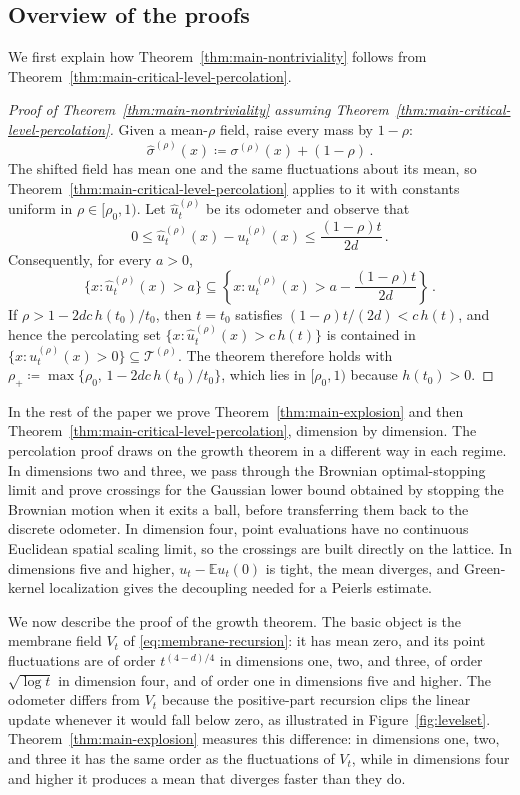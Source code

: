 \documentclass[11pt]{amsart}
\theoremstyle{plain}
\theoremstyle{definition}
\newcommand{\E}{\mathbb{E}}
\begin{document}
\subsection{Overview of the proofs}\label{ssec:overview}

We first explain how Theorem~\ref{thm:main-nontriviality} follows from
Theorem~\ref{thm:main-critical-level-percolation}.

\begin{proof}[Proof of Theorem~\ref{thm:main-nontriviality} assuming Theorem~\ref{thm:main-critical-level-percolation}]
Given a mean-$\rho$ field, raise every mass by $1-\rho$:
\[
    \widehat\sigma^{(\rho)}(x)\coloneqq \sigma^{(\rho)}(x)+(1-\rho)\, .
\]
The shifted field has mean one and the same fluctuations about its mean, so
Theorem~\ref{thm:main-critical-level-percolation} applies to it with constants
uniform in $\rho\in[\rho_0,1)$. Let $\widehat u_t^{(\rho)}$ be its odometer and observe that
\[
    0\leq \widehat u_t^{(\rho)}(x)-u_t^{(\rho)}(x)
    \leq \frac{(1-\rho)t}{2d}\, .
\]
Consequently, for every $a>0$,
\[
    \{x:\widehat u_t^{(\rho)}(x)>a\}
    \subseteq
    \left\{x:u_t^{(\rho)}(x)>a-\frac{(1-\rho)t}{2d}\right\}\, .
\]
If $\rho>1-2dc\,h(t_0)/t_0$, then $t=t_0$ satisfies
$(1-\rho)t/(2d)<c\,h(t)$, and hence the percolating set
$\{x:\widehat u_t^{(\rho)}(x)>c\,h(t)\}$
is contained in $\{x:u_t^{(\rho)}(x)>0\}\subseteq\mathcal T^{(\rho)}$.
The theorem therefore holds with
$\rho_+\coloneqq\max\{\rho_0,\,1-2dc\,h(t_0)/t_0\}$, which lies in
$[\rho_0,1)$ because $h(t_0)>0$.
\end{proof}

In the rest of the paper we prove Theorem~\ref{thm:main-explosion} and then
Theorem~\ref{thm:main-critical-level-percolation}, dimension by dimension. The percolation proof draws on
the growth theorem in a different way in each regime. In dimensions two and
three, we pass through the Brownian optimal-stopping limit and prove crossings
for the Gaussian lower bound obtained by stopping the Brownian motion when it
exits a ball, before transferring them back to the discrete odometer. In dimension four, point evaluations have no continuous
Euclidean spatial scaling limit, so the crossings are built directly on the
lattice. In dimensions five and higher, $u_t-\E u_t(0)$ is tight, the mean
diverges, and Green-kernel localization gives the decoupling needed for a
Peierls estimate.

We now describe the proof of the growth theorem. The basic object is the
membrane field $V_t$ of \eqref{eq:membrane-recursion}: it has mean zero, and
its point fluctuations are of order $t^{(4-d)/4}$ in dimensions one, two, and
three, of order $\sqrt{\log t}$ in dimension four, and of order one in
dimensions five and higher. The odometer differs from $V_t$ because the
positive-part recursion clips the linear update whenever it would fall below
zero, as illustrated in Figure~\ref{fig:levelset}. Theorem~\ref{thm:main-explosion} measures
this difference: in dimensions one, two, and three it has the same order as the fluctuations of $V_t$, while in dimensions four and higher it produces a mean that diverges faster than they do.
\end{document}

